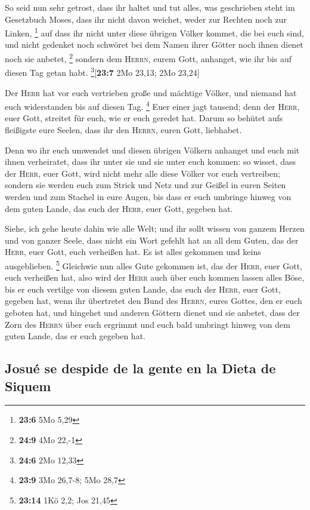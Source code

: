  So seid nun sehr getrost, dass ihr haltet und tut alles,
was geschrieben steht im Gesetzbuch Moses, dass ihr nicht davon weichet,
weder zur Rechten noch zur Linken, \footnote{\textbf{23:6} 5Mo 5,29}
 auf dass ihr nicht unter diese übrigen Völker kommet, die
bei euch sind, und nicht gedenket noch schwöret bei dem Namen ihrer
Götter noch ihnen dienet noch sie anbetet, \footnote{\textbf{24:9} 4Mo
  22,-1}  sondern dem \textsc{Herrn}, eurem Gott,
anhanget, wie ihr bis auf diesen Tag getan habt.
\footnote{\textbf{24:6} 2Mo 12,33}{[}\textbf{23:7} 2Mo 23,13; 2Mo
23,24{]}

 Der \textsc{Herr} hat vor euch vertrieben große und
mächtige Völker, und niemand hat euch widerstanden bis auf diesen Tag.
\footnote{\textbf{23:9} 3Mo 26,7-8; 5Mo 28,7}  Euer einer
jagt tausend; denn der \textsc{Herr}, euer Gott, streitet für euch, wie
er euch geredet hat.  Darum so behütet aufs fleißigste
eure Seelen, dass ihr den \textsc{Herrn}, euren Gott, liebhabet.

 Denn wo ihr euch umwendet und diesen übrigen Völkern
anhanget und euch mit ihnen verheiratet, dass ihr unter sie und sie
unter euch kommen:  so wisset, dass der \textsc{Herr},
euer Gott, wird nicht mehr alle diese Völker vor euch vertreiben;
sondern sie werden euch zum Strick und Netz und zur Geißel in euren
Seiten werden und zum Stachel in eure Augen, bis dass er euch umbringe
hinweg von dem guten Lande, das euch der \textsc{Herr}, euer Gott,
gegeben hat.

 Siehe, ich gehe heute dahin wie alle Welt; und ihr sollt
wissen von ganzem Herzen und von ganzer Seele, dass nicht ein Wort
gefehlt hat an all dem Guten, das der \textsc{Herr}, euer Gott, euch
verheißen hat. Es ist alles gekommen und keins ausgeblieben. \footnote{\textbf{23:14}
  1Kö 2,2; Jos 21,45}  Gleichwie nun alles Gute gekommen
ist, das der \textsc{Herr}, euer Gott, euch verheißen hat, also wird der
\textsc{Herr} auch über euch kommen lassen alles Böse, bis er euch
vertilge von diesem guten Lande, das euch der \textsc{Herr}, euer Gott,
gegeben hat,  wenn ihr übertretet den Bund des
\textsc{Herrn}, eures Gottes, den er euch geboten hat, und hingehet und
anderen Göttern dienet und sie anbetet, dass der Zorn des \textsc{Herrn}
über euch ergrimmt und euch bald umbringt hinweg von dem guten Lande,
das er euch gegeben hat.

\hypertarget{josuuxe9-se-despide-de-la-gente-en-la-dieta-de-siquem}{%
\subsection{Josué se despide de la gente en la Dieta de
Siquem}\label{josuuxe9-se-despide-de-la-gente-en-la-dieta-de-siquem}}

